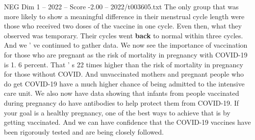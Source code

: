 \begin{textsample}{NEG Dim 1 – 2022 – Score -2.00 – 2022/t003605.txt}
The only group that was more likely to show a meaningful difference in their menstrual cycle length were those who received two doses of the vaccine in one cycle.
Even then, what they observed was temporary.
Their cycles went \textbf{back} to normal within three cycles.
And we ' ve continued to gather data.
We now see the importance of vaccination for those who are pregnant as the risk of mortality in pregnancy with COVID-19 is 1. 6 percent.
That ' s 22 times higher than the risk of mortality in pregnancy for those without COVID.
And unvaccinated mothers and pregnant people who do get COVID-19 have a much higher chance of being admitted to the intensive care unit.
We also now have data showing that infants from people vaccinated during pregnancy do have antibodies to help protect them from COVID-19.
If your goal is a healthy pregnancy, one of the best ways to achieve that is by getting vaccinated.
And we can have confidence that the COVID-19 vaccines have been rigorously tested and are being closely followed.

\end{textsample}

